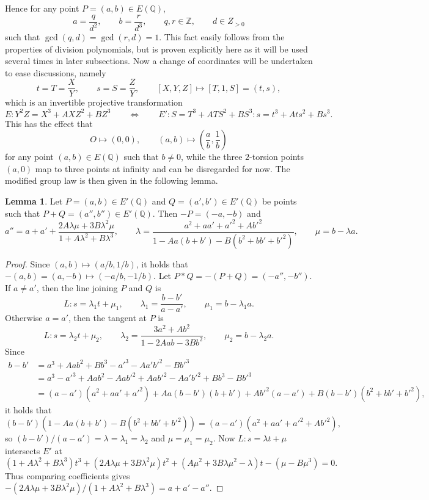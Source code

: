 \documentclass{article}
\newcommand{\Z}{\mathbb{Z}}
\newcommand{\Q}{\mathbb{Q}}
\newcommand{\rb}[1]{\left( #1 \right)}
\renewcommand{\sb}[1]{\left[ #1 \right]}
\theoremstyle{definition}\newtheorem*{definition}{Definition}
\theoremstyle{definition}\newtheorem*{example}{Example}
\theoremstyle{definition}\newtheorem*{remark}{Remark}
\newtheorem{lemma}[proposition]{Lemma}
\begin{document}
Hence for any point $ P = \rb{a, b} \in E\rb{\Q} $,
$$ a = \dfrac{q}{d^2}, \qquad b = \dfrac{r}{d^3}, \qquad q, r \in \Z, \qquad d \in Z_{> 0} $$
such that $ \gcd\rb{q, d} = \gcd\rb{r, d} = 1 $. This fact easily follows from the properties of division polynomials, but is proven explicitly here as it will be used several times in later subsections. Now a change of coordinates will be undertaken to ease discussions, namely
$$ t = T = \dfrac{X}{Y}, \qquad s = S = \dfrac{Z}{Y}, \qquad \sb{X, Y, Z} \mapsto \sb{T, 1, S} = \rb{t, s}, $$
which is an invertible projective transformation
$$ E : Y^2Z = X^3 + AXZ^2 + BZ^3 \qquad \iff \qquad E' : S = T^3 + ATS^2 + BS^3 : s = t^3 + Ats^2 + Bs^3. $$
This has the effect that
$$ O \mapsto \rb{0, 0}, \qquad \rb{a, b} \mapsto \rb{\dfrac{a}{b}, \dfrac{1}{b}} $$
for any point $ \rb{a, b} \in E\rb{\Q} $ such that $ b \ne 0 $, while the three $ 2 $-torsion points $ \rb{a, 0} $ map to three points at infinity and can be disregarded for now. The modified group law is then given in the following lemma.

\begin{lemma}
Let $ P = \rb{a, b} \in E'\rb{\Q} $ and $ Q = \rb{a', b'} \in E'\rb{\Q} $ be points such that $ P + Q = \rb{a'', b''} \in E'\rb{\Q} $. Then $ -P = \rb{-a, -b} $ and
$$ a'' = a + a' + \dfrac{2A\lambda\mu + 3B\lambda^2\mu}{1 + A\lambda^2 + B\lambda^3}, \qquad \lambda = \dfrac{a^2 + aa' + a'^2 + Ab'^2}{1 - Aa\rb{b + b'} - B\rb{b^2 + bb' + b'^2}}, \qquad \mu = b - \lambda a. $$
\end{lemma}

\begin{proof}
Since $ \rb{a, b} \mapsto \rb{a / b, 1 / b} $, it holds that $ -\rb{a, b} = \rb{a, -b} \mapsto \rb{-a / b, -1 / b} $. Let $ P * Q = -\rb{P + Q} = \rb{-a'', -b''} $. If $ a \ne a' $, then the line joining $ P $ and $ Q $ is
$$ L : s = \lambda_1 t + \mu_1, \qquad \lambda_1 = \dfrac{b - b'}{a - a'}, \qquad \mu_1 = b - \lambda_1 a. $$
Otherwise $ a = a' $, then the tangent at $ P $ is
$$ L : s = \lambda_2 t + \mu_2, \qquad \lambda_2 = \dfrac{3a^2 + Ab^2}{1 - 2Aab - 3Bb^2}, \qquad \mu_2 = b - \lambda_2 a. $$
Since
\begin{align*}
b - b'
& = a^3 + Aab^2 + Bb^3 - a'^3 - Aa'b'^2 - Bb'^3 \\
& = a^3 - a'^3 + Aab^2 - Aab'^2 + Aab'^2 - Aa'b'^2 + Bb^3 - Bb'^3 \\
& = \rb{a - a'}\rb{a^2 + aa' + a'^2} + Aa\rb{b - b'}\rb{b + b'} + Ab'^2\rb{a - a'} + B\rb{b - b'}\rb{b^2 + bb' + b'^2},
\end{align*}
it holds that
$$ \rb{b - b'}\rb{1 - Aa\rb{b + b'} - B\rb{b^2 + bb' + b'^2}} = \rb{a - a'}\rb{a^2 + aa' + a'^2 + Ab'^2}, $$
so $ \rb{b - b'} / \rb{a - a'} = \lambda = \lambda_1 = \lambda_2 $ and $ \mu = \mu_1 = \mu_2 $. Now $ L : s = \lambda t + \mu $ intersects $ E' $ at
$$ \rb{1 + A\lambda^2 + B\lambda^3}t^3 + \rb{2A\lambda\mu + 3B\lambda^2\mu}t^2 + \rb{A\mu^2 + 3B\lambda\mu^2 - \lambda}t - \rb{\mu - B\mu^3} = 0. $$
Thus comparing coefficients gives $ -\rb{2A\lambda\mu + 3B\lambda^2\mu} / \rb{1 + A\lambda^2 + B\lambda^3} = a + a' - a'' $.
\end{proof}
\end{document}
